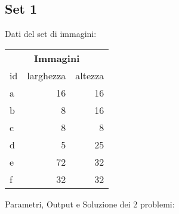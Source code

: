	\subsection{Set 1}
\iffalse
	Nel set sono presenti 6 immagini:
	\begin{itemize}
		\itemsep0em
		\item \texttt{a:\ 16x16};
		\item \texttt{b:\ \ 8x16};
		\item \texttt{c:\ \ 8x\ 8};
		\item \texttt{d:\ \ 5x25};
		\item \texttt{e:\ 72x32};
		\item \texttt{f:\ 32x32};
	\end{itemize}
\fi
%
Dati del set di immagini:  \\
%

\begin{table}[h!]
\centering
\footnotesize
\begin{tabular}{l|r|r}
\multicolumn{3}{c}{\textbf{Immagini}} \\ 
id & larghezza & altezza \\
\hline
a & 16 & 16 \\
		 b & 8&16\\
		 c & 8& 8\\
		 d & 5&25\\
		 e & 72&32\\
		 f & 32 &32\\
\end{tabular}
\end{table}
%


\noindent Parametri, Output e Soluzione dei 2 problemi: 

